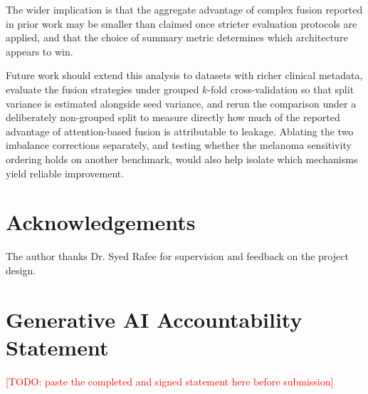 \documentclass[conference]{IEEEtran}
\newcommand{\TODO}[1]{\textcolor{red}{[TODO: #1]}}
\begin{document}
The wider implication is that the aggregate advantage of complex fusion reported in prior work may be smaller than claimed once stricter evaluation protocols are applied, and that the choice of summary metric determines which architecture appears to win.

Future work should extend this analysis to datasets with richer clinical metadata, evaluate the fusion strategies under grouped $k$-fold cross-validation so that split variance is estimated alongside seed variance, and rerun the comparison under a deliberately non-grouped split to measure directly how much of the reported advantage of attention-based fusion is attributable to leakage. Ablating the two imbalance corrections separately, and testing whether the melanoma sensitivity ordering holds on another benchmark, would also help isolate which mechanisms yield reliable improvement.

\section*{Acknowledgements}

The author thanks Dr. Syed Rafee for supervision and feedback on the project design.



\appendix
\section{Generative AI Accountability Statement}

\TODO{paste the completed and signed statement here before submission}
\end{document}
